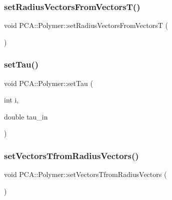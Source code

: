 \subsubsection{\texorpdfstring{set\+Radius\+Vectors\+From\+Vectors\+T()}{setRadiusVectorsFromVectorsT()}}
{\footnotesize\ttfamily void P\+C\+A\+::\+Polymer\+::set\+Radius\+Vectors\+From\+VectorsT (\begin{DoxyParamCaption}{ }\end{DoxyParamCaption})}

\hypertarget{class_p_c_a_1_1_polymer_a4ac116507767651444c852a75ab79c2d}{}\label{class_p_c_a_1_1_polymer_a4ac116507767651444c852a75ab79c2d} 
\subsubsection{\texorpdfstring{set\+Tau()}{setTau()}}
{\footnotesize\ttfamily void P\+C\+A\+::\+Polymer\+::set\+Tau (\begin{DoxyParamCaption}\item[{int}]{i,  }\item[{double}]{tau\+\_\+in }\end{DoxyParamCaption})\hspace{0.3cm}{\ttfamily [inline]}}

\hypertarget{class_p_c_a_1_1_polymer_aa655eb1299b272fef8c91f003abbf50d}{}\label{class_p_c_a_1_1_polymer_aa655eb1299b272fef8c91f003abbf50d} 
\subsubsection{\texorpdfstring{set\+Vectors\+Tfrom\+Radius\+Vectors()}{setVectorsTfromRadiusVectors()}}
{\footnotesize\ttfamily void P\+C\+A\+::\+Polymer\+::set\+Vectors\+Tfrom\+Radius\+Vectors (\begin{DoxyParamCaption}{ }\end{DoxyParamCaption})}

\hypertarget{class_p_c_a_1_1_polymer_a55787461ed50776c48819a5cc3911c38}{}\label{class_p_c_a_1_1_polymer_a55787461ed50776c48819a5cc3911c38} 
